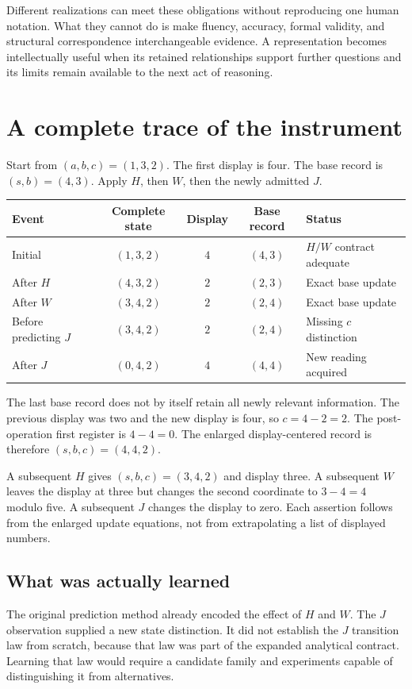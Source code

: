 \documentclass[11pt,letterpaper]{article}
\theoremstyle{plain}
\theoremstyle{definition}
\begin{document}
Different realizations can meet these obligations without reproducing one human notation. What they cannot do is make fluency, accuracy, formal validity, and structural correspondence interchangeable evidence. A representation becomes intellectually useful when its retained relationships support further questions and its limits remain available to the next act of reasoning.

\clearpage\appendix
\section{A complete trace of the instrument}\label{app:trace}
Start from $(a,b,c)=(1,3,2)$. The first display is four. The base record is $(s,b)=(4,3)$. Apply $H$, then $W$, then the newly admitted $J$.

\begin{center}
\begin{tabular}{@{}lcccl@{}}\toprule
Event & Complete state & Display & Base record & Status\\\midrule
Initial & $(1,3,2)$ & $4$ & $(4,3)$ & $H/W$ contract adequate\\
After $H$ & $(4,3,2)$ & $2$ & $(2,3)$ & Exact base update\\
After $W$ & $(3,4,2)$ & $2$ & $(2,4)$ & Exact base update\\
Before predicting $J$ & $(3,4,2)$ & $2$ & $(2,4)$ & Missing $c$ distinction\\
After $J$ & $(0,4,2)$ & $4$ & $(4,4)$ & New reading acquired\\\bottomrule
\end{tabular}
\end{center}

The last base record does not by itself retain all newly relevant information. The previous display was two and the new display is four, so $c=4-2=2$. The post-operation first register is $4-4=0$. The enlarged display-centered record is therefore $(s,b,c)=(4,4,2)$.

A subsequent $H$ gives $(s,b,c)=(3,4,2)$ and display three. A subsequent $W$ leaves the display at three but changes the second coordinate to $3-4=4$ modulo five. A subsequent $J$ changes the display to zero. Each assertion follows from the enlarged update equations, not from extrapolating a list of displayed numbers.

\subsection{What was actually learned}
The original prediction method already encoded the effect of $H$ and $W$. The $J$ observation supplied a new state distinction. It did not establish the $J$ transition law from scratch, because that law was part of the expanded analytical contract. Learning that law would require a candidate family and experiments capable of distinguishing it from alternatives.
\end{document}
